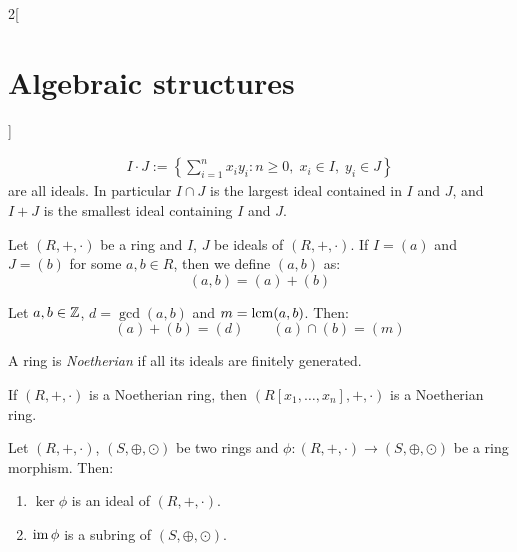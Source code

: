 \documentclass[../../../main_math.tex]{subfiles}
\begin{document}
\begin{multicols}{2}[\section{Algebraic structures}]
\begin{proposition}
\begin{gather*}
      I\cdot J:=\left\{\sum_{i=1}^nx_iy_i:n\geq 0,\;x_i\in I,\;y_i\in J\right\}
    \end{gather*}
    are all ideals. In particular $I\cap J$ is the largest ideal contained in $I$ and $J$, and $I+J$ is the smallest ideal containing $I$ and $J$.
  \end{proposition}
  \begin{definition}
    Let $(R,+,\cdot)$ be a ring and $I$, $J$ be ideals of $(R,+,\cdot)$. If $I=(a)$ and $J=(b)$ for some $a,b\in R$, then we define $(a,b)$ as: $$(a,b)=(a)+(b)$$
  \end{definition}
  \begin{proposition}
    Let $a,b\in\mathbb{Z}$, $d=\gcd(a,b)$ and $m=\operatorname{lcm}(a,b)$. Then: $$(a)+(b)=(d)\qquad(a)\cap(b)=(m)$$
  \end{proposition}
  \begin{definition}
    A ring is \emph{Noetherian} if all its ideals are finitely generated.
  \end{definition}
  \begin{theorem}
    If $(R,+,\cdot)$ is a Noetherian ring, then $(R[x_1,\ldots,x_n],+,\cdot)$ is a Noetherian ring.
  \end{theorem}
  \begin{lemma}
    Let $(R,+,\cdot)$, $(S,\oplus,\odot)$ be two rings and $\phi:(R,+,\cdot)\rightarrow (S,\oplus,\odot)$ be a ring morphism. Then:
    \begin{enumerate}
      \item $\ker\phi$ is an ideal of $(R,+,\cdot)$.
      \item $\operatorname{im}\phi$ is a subring of $(S,\oplus,\odot)$.
    \end{enumerate}
  \end{lemma}

\end{multicols}
\end{document}
